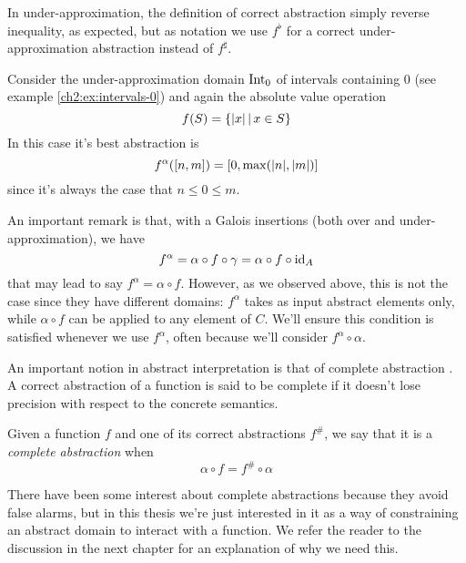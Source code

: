 In under-approximation, the definition of correct abstraction simply reverse inequality, as expected, but as notation we use $f^{\flat}$ for a correct under-approximation abstraction instead of $f^{\sharp}$.
\begin{example}
	Consider the under-approximation domain $\text{Int}_0$ of intervals containing 0 (see example \ref{ch2:ex:intervals-0}) and again the absolute value operation
	\[
	f(S) = \{ \lvert x\rvert \,\vert\, x \in S \}
	\]
	In this case it's best abstraction is
	\[
	f^{\alpha}([n, m]) = [0, \max(\lvert n\rvert, \lvert m\rvert)]
	\]
	since it's always the case that $n \le 0 \le m$.
\end{example}

An important remark is that, with a Galois insertions (both over and under-approximation), we have
\[
f^{\alpha} = \alpha \circ f \circ \gamma = \alpha \circ f \circ \text{id}_A
\]
that may lead to say $f^{\alpha} = \alpha \circ f$. However, as we observed above, this is not the case since they have different domains: $f^{\alpha}$ takes as input abstract elements only, while $\alpha \circ f$ can be applied to any element of $C$. We'll ensure this condition is satisfied whenever we use $f^{\alpha}$, often because we'll consider $f^{\alpha} \circ \alpha$.

An important notion in abstract interpretation is that of complete abstraction \cite{giacobazzi-making-abstr-complete}. A correct abstraction of a function is said to be complete if it doesn't lose precision with respect to the concrete semantics.
\begin{definition}\label{ch2:def:complete-abstr}
	Given a function $f$ and one of its correct abstractions $f^{\#}$, we say that it is a \textit{complete abstraction} when
	\[
	\alpha \circ f = f^{\#} \circ \alpha
	\]
\end{definition}
There have been some interest about complete abstractions \cite{giacobazzi-making-abstr-complete,giacobazzi-analyzing-analyses,bruni-abst-intensionality} because they avoid false alarms, but in this thesis we're just interested in it as a way of constraining an abstract domain to interact with a function. We refer the reader to the discussion in the next chapter for an explanation of why we need this.
